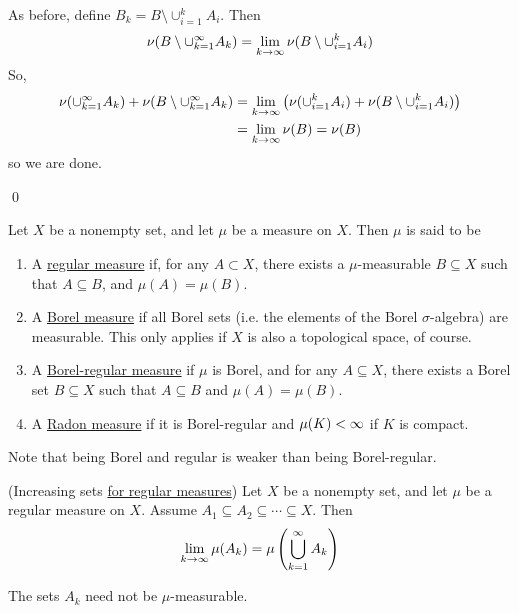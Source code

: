 \documentclass[x11names,reqno,14pt]{extarticle}
\newcommand{\seq}[1]{_{#1 = 1}^\oo}
\newcommand{\bigcupk}{\bigcup\seq{k}}
\begin{document}
As before, define $B_k = B\setminus \cup_{i=1}^kA_i$. Then
\[
\nu(B\setminus\cup\seq{k}A_k) = \lim_{k\to\oo}\nu(B\setminus\cup_{i=1}^kA_i)
\]
So, 
\begin{align*}
\nu(\cup\seq{k}A_k) + \nu(B\setminus\cup\seq{k}A_k) & = \lim_{k\to\oo}\left(\nu(\cup_{i=1}^kA_i) + \nu(B\setminus\cup_{i=1}^kA_i)\right) \\
& = \lim_{k\to\oo}\nu(B) = \nu(B) \\
\end{align*}
so we are done. 

\qed


Let $X$ be a nonempty set, and let $\mu$ be a measure on $X$. Then $\mu$ is said to be 
\begin{enumerate}
\item A \underline{regular measure} if, for any $A \subset X$, there exists a $\mu$-measurable $B\subseteq X$ such that $A \subseteq B$, and $\mu(A) = \mu(B)$. 
\item A \underline{Borel measure} if all Borel sets (i.e. the elements of the Borel $\sigma$-algebra) are measurable. This only applies if $X$ is also a topological space, of course. 
\item A \underline{Borel-regular measure} if $\mu$ is Borel, and for any $A \subseteq X$, there exists a Borel set $B \subseteq X$ such that $A \subseteq B$ and $\mu(A) = \mu(B)$. 
\item A \underline{Radon measure} if it is Borel-regular and $\mu(K)<\infty$ if $K$ is compact. 
\end{enumerate}

\rem

Note that being Borel and regular is weaker than being Borel-regular. 

\thm (Increasing sets \underline{for regular measures})
Let $X$ be a nonempty set, and let $\mu$ be a regular measure on $X$. Assume $A_1\subseteq A_2 \subseteq \cdots \subseteq X$. Then 
\[
\lim_{k\to\oo}\mu(A_k) = \mu\left(\bigcupk A_k\right)
\]

\rem The sets $A_k$ need not be $\mu$-measurable. 

\proof
\end{document}
